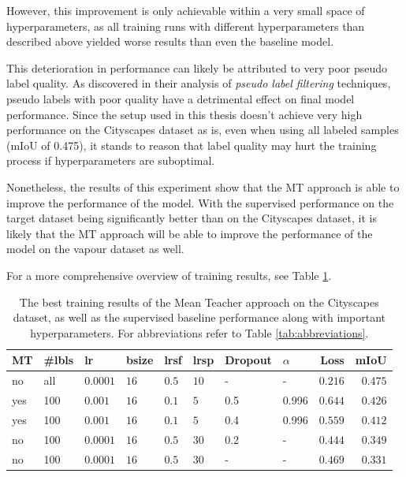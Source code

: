 However, this improvement is only achievable within a very small space of hyperparameters, as all training runs with different hyperparameters than described above yielded worse results than even the baseline model.

This deterioration in performance can likely be attributed to very poor pseudo label quality. As \citeauthor{schererPseudoLabelNoiseSuppression2022}\cite{schererPseudoLabelNoiseSuppression2022} discovered in their analysis of \emph{pseudo label filtering} techniques, pseudo labels with poor quality have a detrimental effect on final model performance.
Since the setup used in this thesis doesn't achieve very high performance on the Cityscapes dataset as is, even when using all labeled samples (mIoU of \num{0.475}), it stands to reason that label quality may hurt the training process if hyperparameters are suboptimal.

Nonetheless, the results of this experiment show that the MT approach is able to improve the performance of the model. With the supervised performance on the target dataset being significantly better than on the Cityscapes dataset, it is likely that the MT approach will be able to improve the performance of the model on the vapour dataset as well.

For a more comprehensive overview of training results, see Table \ref{tab:cityscapes_results_mt}.

\begin{table}[htbp]
    \centering
    \begin{tabular}{llllllllrr}
        \toprule
        MT & \#lbls & lr & bsize & lrsf & lrsp & Dropout & $\alpha$ & Loss &
        mIoU \\
        \midrule 
        no & all & $0.0001$ & $16$ & $0.5$ & $10$ & - & - & $0.216$ & $0.475$ \\ \midrule
        yes & 100 & $0.001$ & $16$ & $0.1$ & $5$ & \num{0.5} & \num{0.996} & $0.644$ & $\mathbf{0.426}$ \\
        yes & 100 & $0.001$ & $16$ & $0.1$ & $5$ & \num{0.4} & \num{0.996} & $0.559$ & $0.412$ \\
        no & 100 & $0.0001$ & $16$ & $0.5$ & $30$ & \num{0.2} & - & $0.444$ & $0.349$ \\
        no & 100 & $0.0001$ & $16$ & $0.5$ & $30$ & - & - & $0.469$ & $0.331$ \\
        \bottomrule
    \end{tabular}
    \vspace{0.1cm}
    \caption{The best training results of the Mean Teacher approach on the Cityscapes dataset, as well as the supervised baseline performance along with important hyperparameters. For abbreviations refer to Table \ref{tab:abbreviations}.}
    \label{tab:cityscapes_results_mt}
\end{table}

